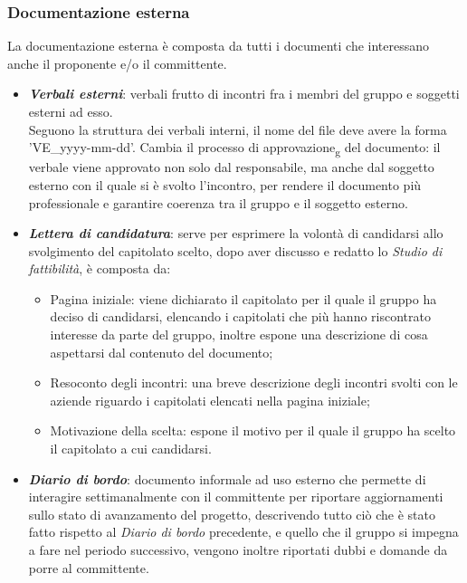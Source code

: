 \subsubsection{Documentazione esterna}
La documentazione esterna è composta da tutti i documenti che interessano anche
il proponente e/o il committente.
\begin{itemize}
      \item \textit{\textbf{Verbali esterni}}: verbali frutto di incontri fra i membri del gruppo e soggetti esterni ad esso.\\
            Seguono la struttura dei verbali interni, il nome del file deve avere la forma 'VE\_yyyy-mm-dd'. Cambia il processo di approvazione\textsubscript{g} del documento:
            il verbale viene approvato non solo dal responsabile, ma anche dal soggetto esterno con il quale si è svolto l'incontro,
            per rendere il documento più professionale e garantire coerenza tra il gruppo e il soggetto esterno.
      \item \textit{\textbf{Lettera di candidatura}}: serve per esprimere la volontà di candidarsi allo svolgimento del capitolato scelto, dopo aver discusso e redatto lo \textit{Studio di fattibilità},
            è composta da:
            \begin{itemize}
                  \item Pagina iniziale: viene dichiarato il capitolato per il quale il gruppo ha
                        deciso di candidarsi, elencando i capitolati che più hanno riscontrato
                        interesse da parte del gruppo, inoltre espone una descrizione di cosa
                        aspettarsi dal contenuto del documento;
                  \item Resoconto degli incontri: una breve descrizione degli incontri svolti con le
                        aziende riguardo i capitolati elencati nella pagina iniziale;
                  \item Motivazione della scelta: espone il motivo per il quale il gruppo ha scelto il
                        capitolato a cui candidarsi.
            \end{itemize}
      \item \textit{\textbf{Diario di bordo}}: documento informale ad uso esterno che permette di interagire settimanalmente con il committente per riportare aggiornamenti sullo stato di
            avanzamento del progetto, descrivendo tutto ciò che è stato fatto rispetto al \textit{Diario di bordo} precedente,
            e quello che il gruppo si impegna a fare nel periodo successivo, vengono inoltre riportati dubbi e domande da porre al committente.

\end{itemize}

